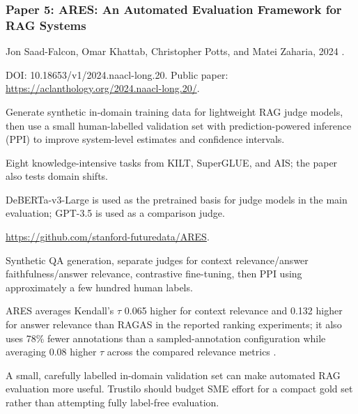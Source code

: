 \documentclass[11pt,journal,onecolumn]{IEEEtran}
\begin{document}
\subsubsection{Paper 5: ARES: An Automated Evaluation Framework for RAG Systems}
\begin{description}[leftmargin=3.25cm,style=nextline]
\item[Authors / Year] Jon Saad-Falcon, Omar Khattab, Christopher Potts, and Matei Zaharia, 2024 \cite{saadfalcon2024ares}.
\item[DOI / Link] DOI: 10.18653/v1/2024.naacl-long.20. Public paper: \url{https://aclanthology.org/2024.naacl-long.20/}.
\item[Main idea] Generate synthetic in-domain training data for lightweight RAG judge models, then use a small human-labelled validation set with prediction-powered inference (PPI) to improve system-level estimates and confidence intervals.
\item[Datasets] Eight knowledge-intensive tasks from KILT, SuperGLUE, and AIS; the paper also tests domain shifts.
\item[Models] DeBERTa-v3-Large is used as the pretrained basis for judge models in the main evaluation; GPT-3.5 is used as a comparison judge.
\item[Code] \url{https://github.com/stanford-futuredata/ARES}.
\item[Procedure / tricks] Synthetic QA generation, separate judges for context relevance/answer faithfulness/answer relevance, contrastive fine-tuning, then PPI using approximately a few hundred human labels.
\item[Metrics / results] ARES averages Kendall's $\tau$ 0.065 higher for context relevance and 0.132 higher for answer relevance than RAGAS in the reported ranking experiments; it also uses 78\% fewer annotations than a sampled-annotation configuration while averaging 0.08 higher $\tau$ across the compared relevance metrics \cite{saadfalcon2024ares}.
\item[Key learning] A small, carefully labelled in-domain validation set can make automated RAG evaluation more useful. Trustilo should budget SME effort for a compact gold set rather than attempting fully label-free evaluation.
\end{description}
\end{document}
